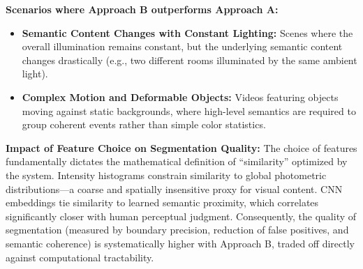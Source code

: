 \textbf{Scenarios where Approach B outperforms Approach A:}
\begin{itemize}
    \item \textbf{Semantic Content Changes with Constant Lighting:} Scenes where the overall illumination remains constant, but the underlying semantic content changes drastically (e.g., two different rooms illuminated by the same ambient light).
    \item \textbf{Complex Motion and Deformable Objects:} Videos featuring objects moving against static backgrounds, where high-level semantics are required to group coherent events rather than simple color statistics.
\end{itemize}

\textbf{Impact of Feature Choice on Segmentation Quality:}
The choice of features fundamentally dictates the mathematical definition of ``similarity'' optimized by the system. Intensity histograms constrain similarity to global photometric distributions—a coarse and spatially insensitive proxy for visual content. CNN embeddings tie similarity to learned semantic proximity, which correlates significantly closer with human perceptual judgment. Consequently, the quality of segmentation (measured by boundary precision, reduction of false positives, and semantic coherence) is systematically higher with Approach B, traded off directly against computational tractability.